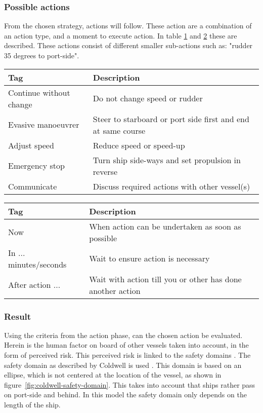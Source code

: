 \subsubsection{Possible actions}
From the chosen strategy, actions will follow. These action are a combination of an action type, and a moment to execute action. In table \ref{tab:actions} and \ref{tab:time-domain-action} these are described. These actions consist of different smaller sub-actions such as: "rudder 35 degrees to port-side". 
\begin{table}[H]
	\begin{tabular}{p{}|p{}}
		\toprule
		Tag & Description\\
		\midrule
		Continue without change & Do not change speed or rudder\\
		Evasive manoeuvrer & Steer to starboard or port side first and end at same course\\
		Adjust speed & Reduce speed or speed-up \\
		Emergency stop & Turn ship side-ways and set propulsion in reverse\\
		Communicate & Discuss required actions with other vessel(s)\\
		\bottomrule
	\end{tabular}
	
	\label{tab:actions}
\end{table}

\begin{table}[H]
	\begin{tabular}{p{}|p{}}
		\toprule
		Tag & Description\\
		\midrule
		Now & When action can be undertaken as soon as possible \\
		In ... minutes/seconds & Wait to ensure action is necessary \\
		After action ... & Wait with action till you or other has done another action \\
		\bottomrule
	\end{tabular}
	
	\label{tab:time-domain-action}
\end{table}

\subsubsection{Result}
Using the criteria from the action phase, can the chosen action be evaluated. Herein is the human factor on board of other vessels taken into account, in the form of perceived risk. This perceived risk is linked to the safety domains \cite{Szlapczynski2017a}. The safety domain as described by Coldwell is used \cite{Coldwell1983}. This domain is based on an ellipse, which is not centered at the location of the vessel, as shown in figure~\ref{fig:coldwell-safety-domain}. This takes into account that ships rather pass on port-side and behind. In this model the safety domain only depends on the length of the ship.


